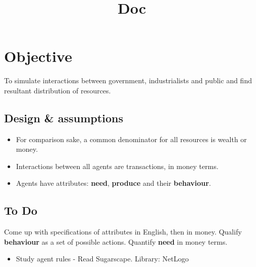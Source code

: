 \documentclass{article}
\begin{document}
\title{Doc}
\maketitle
\section{Objective}
To simulate interactions between government, industrialists and public and find resultant distribution of resources. 

\subsection{Design \& assumptions}
\begin{itemize}
\item For comparison sake, a common denominator for all resources is wealth or money.
\item  Interactions between all agents are transactions, in money terms.
\item Agents have attributes: \textbf{need}, \textbf{produce} and their \textbf{behaviour}.
\end{itemize}

\subsection{To Do}
Come up with specifications of attributes in English, then in money. Qualify \textbf{behaviour} as a set of possible actions. Quantify \textbf{need} in money terms.

\begin{itemize}
\item Study agent rules - Read Sugarscape. Library: NetLogo
\end{itemize}
\end{document}
